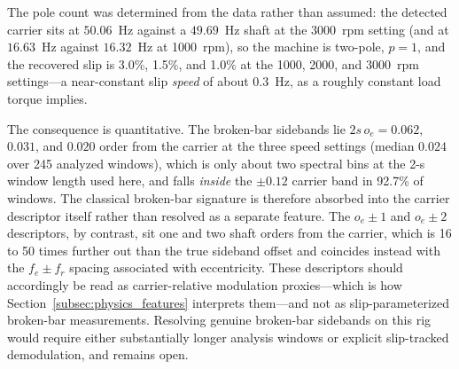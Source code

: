 The pole count was determined from the data rather than assumed: the detected
carrier sits at $50.06$~Hz against a $49.69$~Hz shaft at the 3000~rpm setting
(and at $16.63$~Hz against $16.32$~Hz at 1000~rpm), so the machine is
two-pole, $p=1$, and the recovered slip is 3.0\%, 1.5\%, and 1.0\% at the
1000, 2000, and 3000~rpm settings---a near-constant slip \emph{speed} of about
$0.3$~Hz, as a roughly constant load torque implies.

The consequence is quantitative. The broken-bar sidebands lie $2 s\, o_e =
0.062$, $0.031$, and $0.020$ order from the carrier at the three speed
settings (median $0.024$ over 245 analyzed windows), which is only about two
spectral bins at the 2-s window length used here, and falls \emph{inside} the
$\pm0.12$ carrier band in 92.7\% of windows. The classical broken-bar
signature is therefore absorbed into the carrier descriptor itself rather
than resolved as a separate feature. The $o_e \pm 1$ and $o_e \pm 2$
descriptors, by contrast, sit one and two shaft orders from the carrier,
which is 16 to 50 times further out than the true sideband offset and
coincides instead with the $f_e \pm f_r$ spacing associated with
eccentricity. These descriptors should accordingly be read as
carrier-relative modulation proxies---which is how
Section~\ref{subsec:physics_features} interprets them---and not as
slip-parameterized broken-bar measurements. Resolving genuine broken-bar
sidebands on this rig would require either substantially longer analysis
windows or explicit slip-tracked demodulation, and remains open.
